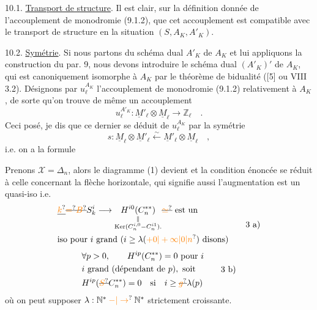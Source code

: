 10.1. \uline{Transport de structure}. Il est clair, sur la définition donnée de l'accouplement de monodromie (9.1.2), que cet accouplement est compatible avec le transport de structure en la situation $(S,A_K,A'_K)$.

10.2. \uline{Symétrie}. Si nous partons du schéma dual $A'_K$ de $A_K$ et lui appliquons la construction du par. 9, nous devons introduire le schéma dual $(A'_K)'$ de $A_K$, qui est canoniquement isomorphe à $A_K$ par le théorème de bidualité ([5] ou VIII 3.2). Désignons par $u_\ell^{A_K}$ l'accouplement de monodromie (9.1.2) relativement à $A_K$, de sorte qu'on trouve de même un accouplement
\[
 u_\ell^{A'_K}:\underline M'_\ell\otimes\underline M_\ell\longrightarrow\mathbb Z_\ell\quad.\tag*{(10.2.1)}
\]
Ceci posé, je dis que ce dernier se déduit de $u_\ell^{A_K}$ par la symétrie
\[
 s:\underline M_\ell\otimes\underline M'_\ell\xleftarrow{\sim}\underline M'_\ell\otimes\underline M_\ell\quad,
\]
i.e. on a la formule

Prenons $\mathscr X=\Delta_n$, alors  le diagramme (1) devient
\diagram{\begin{tikzcd}[ampersand replacement=\&,column sep=small]
 \mathbb R^*\Gamma(\Delta_n,S_k)\simeq S_k\arrow[r] \& \mathbb R^*\Gamma(\Delta_n,C^{**}\unsure{]|)}=\deleted{\unsure{A}}C_n^{**}\\
 \& C^{**}(\Delta_n)=C_n^{**}\arrow[u,"{\mathrm{id}_{C_n^{**}}}"']
\end{tikzcd}}
et la condition énoncée se réduit à celle concernant la flèche horizontale, qui signifie aussi
l'augmentation est un quasi-iso i.e.
\[
 \begin{aligned}
 &\deleted{\unsure{k}}\deleted{\unsure{=}}\deleted{\unsure{B}}S_k^i\longrightarrow
 \underset{\substack{\Vert\\\operatorname{Ker}(C_n^{i,0}\mathbin{-}C_n^{i1}).}}{H^{i0}(C_n^{**})}
 \deleted{\unsure{\simeq}}\ \text{est un}\\
 &\text{iso pour }i\text{ grand }(i\geq\lambda(\unsure{+0|+{\infty}|0|n})\ \text{disons})
 \end{aligned}\tag*{3 a)}
\]
\[
 \begin{aligned}
 &\forall p>0,\qquad H^{ip}(C_n^{**})=0\ \text{pour }i\\
 &i\text{ grand (dépendant de }p),\ \text{soit}\\
 &H^{ip}(\deleted{\unsure{S}}C_n^{**})=0\quad\text{si}\quad i\geq\deleted{\unsure{g}}\lambda(p)
 \end{aligned}\tag*{3 b)}
\]
où on peut supposer $\lambda:\mathbb N^{*}\mathbin{\unsure{-|\to}}\mathbb N^{*}$ strictement croissante.

